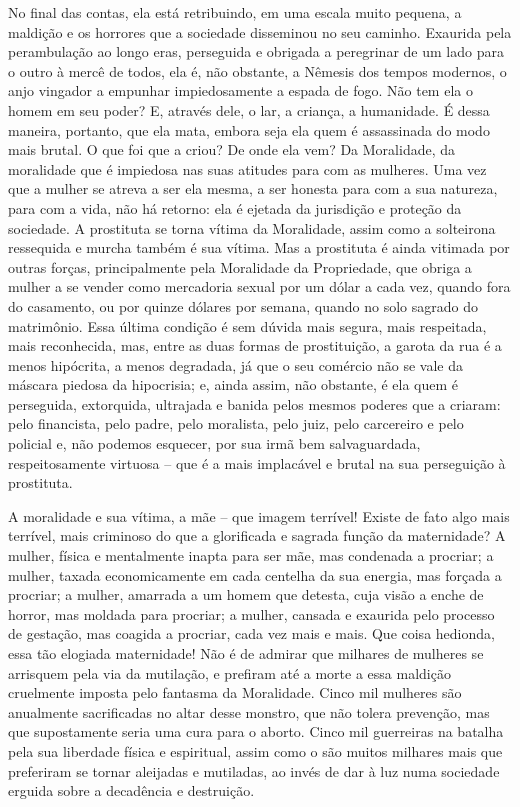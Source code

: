 No final das contas, ela está retribuindo, em uma escala muito pequena,
a maldição e os horrores que a sociedade disseminou no seu caminho.
Exaurida pela perambulação ao longo eras, perseguida e obrigada a
peregrinar de um lado para o outro à mercê de todos, ela é, não
obstante, a Nêmesis dos tempos modernos, o anjo vingador a empunhar
impiedosamente a espada de fogo. Não tem ela o homem em seu poder? E,
através dele, o lar, a criança, a humanidade. É dessa maneira, portanto,
que ela mata, embora seja ela quem é assassinada do modo mais brutal. O
que foi que a criou? De onde ela vem? Da Moralidade, da moralidade que é
impiedosa nas suas atitudes para com as mulheres. Uma vez que a mulher
se atreva a ser ela mesma, a ser honesta para com a sua natureza, para
com a vida, não há retorno: ela é ejetada da jurisdição e proteção da
sociedade. A prostituta se torna vítima da Moralidade, assim como a
solteirona ressequida e murcha também é sua vítima. Mas a prostituta é
ainda vitimada por outras forças, principalmente pela Moralidade da
Propriedade, que obriga a mulher a se vender como mercadoria sexual por
um dólar a cada vez, quando fora do casamento, ou por quinze dólares por
semana, quando no solo sagrado do matrimônio. Essa última condição é sem
dúvida mais segura, mais respeitada, mais reconhecida, mas, entre as
duas formas de prostituição, a garota da rua é a menos hipócrita, a
menos degradada, já que o seu comércio não se vale da máscara piedosa da
hipocrisia; e, ainda assim, não obstante, é ela quem é perseguida,
extorquida, ultrajada e banida pelos mesmos poderes que a criaram: pelo
financista, pelo padre, pelo moralista, pelo juiz, pelo carcereiro e
pelo policial e, não podemos esquecer, por sua irmã bem salvaguardada,
respeitosamente virtuosa -- que é a mais implacável e brutal na sua
perseguição à prostituta.

A moralidade e sua vítima, a mãe -- que imagem terrível! Existe de fato
algo mais terrível, mais criminoso do que a glorificada e sagrada função
da maternidade? A mulher, física e mentalmente inapta para ser mãe, mas
condenada a procriar; a mulher, taxada economicamente em cada centelha
da sua energia, mas forçada a procriar; a mulher, amarrada a um homem
que detesta, cuja visão a enche de horror, mas moldada para procriar; a
mulher, cansada e exaurida pelo processo de gestação, mas coagida a
procriar, cada vez mais e mais. Que coisa hedionda, essa tão elogiada
maternidade! Não é de admirar que milhares de mulheres se arrisquem pela
via da mutilação, e prefiram até a morte a essa maldição cruelmente
imposta pelo fantasma da Moralidade. Cinco mil mulheres são anualmente
sacrificadas no altar desse monstro, que não tolera prevenção, mas que
supostamente seria uma cura para o aborto. Cinco mil guerreiras na
batalha pela sua liberdade física e espiritual, assim como o são muitos
milhares mais que preferiram se tornar aleijadas e mutiladas, ao invés
de dar à luz numa sociedade erguida sobre a decadência e destruição.

